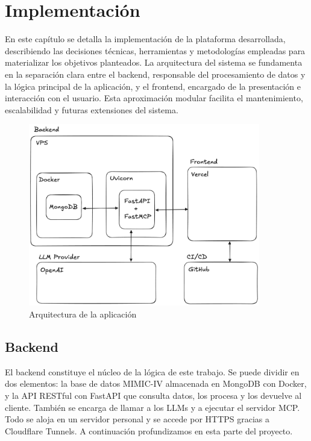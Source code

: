 \chapter{Implementación}

En este capítulo se detalla la implementación de la plataforma desarrollada, describiendo las decisiones técnicas, herramientas y metodologías empleadas para materializar los objetivos planteados. La arquitectura del sistema se fundamenta en la separación clara entre el backend, responsable del procesamiento de datos y la lógica principal de la aplicación, y el frontend, encargado de la presentación e interacción con el usuario. Esta aproximación modular facilita el mantenimiento, escalabilidad y futuras extensiones del sistema.

\begin{figure}[H]
  \centering
  \includegraphics[width=0.9\textwidth]{imagenes/arch1.png}
  \caption{Arquitectura de la aplicación}
  \label{fig:arch1}
\end{figure}

\section{Backend}

El backend constituye el núcleo de la lógica de este trabajo. Se puede dividir en dos elementos: la base de datos MIMIC-IV almacenada en MongoDB con Docker, y la API RESTful con FastAPI que consulta datos, los procesa y los devuelve al cliente. También se encarga de llamar a los LLMs y a ejecutar el servidor MCP. Todo se aloja en un servidor personal y se accede por HTTPS gracias a Cloudflare Tunnels. A continuación profundizamos en esta parte del proyecto.

